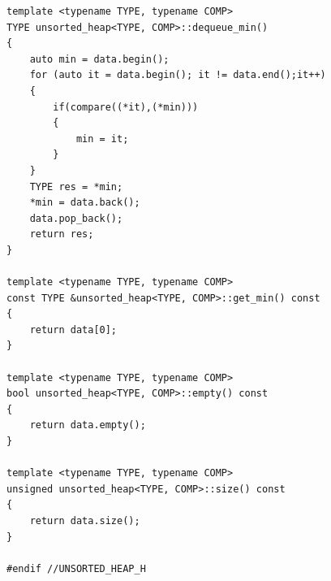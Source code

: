 \documentclass[12pt,a4paper]{article}
\theoremstyle{definition}
\begin{document}
\begin{lstlisting}
template <typename TYPE, typename COMP>
TYPE unsorted_heap<TYPE, COMP>::dequeue_min()
{
    auto min = data.begin();
    for (auto it = data.begin(); it != data.end();it++)
    {
        if(compare((*it),(*min)))
        {
            min = it;
        }
    }
    TYPE res = *min;
    *min = data.back();
    data.pop_back();
    return res;
}

template <typename TYPE, typename COMP>
const TYPE &unsorted_heap<TYPE, COMP>::get_min() const
{
    return data[0];
}

template <typename TYPE, typename COMP>
bool unsorted_heap<TYPE, COMP>::empty() const
{
    return data.empty();
}

template <typename TYPE, typename COMP>
unsigned unsorted_heap<TYPE, COMP>::size() const
{
    return data.size();
}

#endif //UNSORTED_HEAP_H
     
\end{lstlisting}
\end{document}
